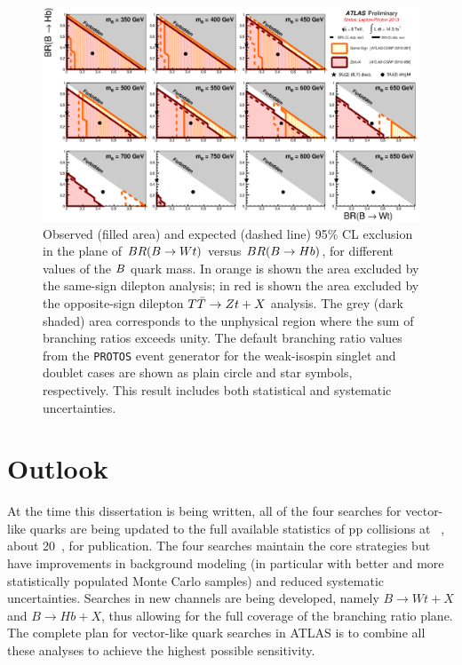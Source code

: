 \begin{landscape}
\begin{figure}[h!bt]
\centering
\includegraphics[width=1.5\textwidth]{results/figures/ATLAS_VLQ_BB_june2013_step2.eps}
\caption{
Observed (filled area) and expected (dashed line) 95\% CL exclusion in the plane of
$BR(\B \to Wt)$ versus $BR(\B \to Hb)$, for different values of the $\B$ quark mass.
In orange is shown the area excluded by the same-sign dilepton analysis;
in red is shown the area excluded by the opposite-sign dilepton $\TTbar\to Zt+X$ analysis.
The grey (dark shaded) area corresponds to the unphysical region where the sum of branching ratios exceeds unity. 
The default branching ratio values from the \texttt{PROTOS} event generator for the weak-isospin singlet and doublet cases 
are shown as plain circle and star symbols, respectively. This result includes both statistical and systematic uncertainties.
\label{fig:limits2D_allvlb}}
\end{figure}
\end{landscape}



\section{Outlook}\label{sec:combOUT}

At the time this dissertation is being
written, all of the four searches for
vector-like quarks are being updated to
the full available statistics of
pp collisions at ~\tev, about 20~\ifb,
for publication. The four searches maintain the
core strategies but have improvements in
background modeling (in particular with better
and more statistically populated Monte Carlo samples)
and reduced systematic uncertainties.
Searches in new channels are being developed, namely
$B\to Wt+X$ and $B\to Hb+X$, thus allowing for
the full coverage of the branching ratio plane.
The complete plan for vector-like quark searches
in ATLAS is to combine all these analyses to 
achieve the highest possible sensitivity.
